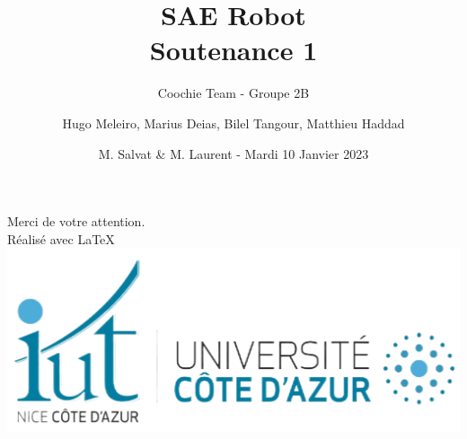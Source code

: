 \documentclass{sintefbeamer}
\title{SAE Robot \\ Soutenance 1}
\subtitle{Coochie Team - Groupe 2B}
\author{Hugo Meleiro, Marius Deias, Bilel Tangour, Matthieu Haddad}
\date{M. Salvat \& M. Laurent - Mardi 10 Janvier 2023}
\begin{document}
\maketitle








  \begin{frame}%
    \vfill
      Merci de votre attention.
      \\ Réalisé avec \LaTeX
      \\
      \includegraphics[width=0.2\linewidth]{Images/iut.png}
  \end{frame}%
\end{document}
